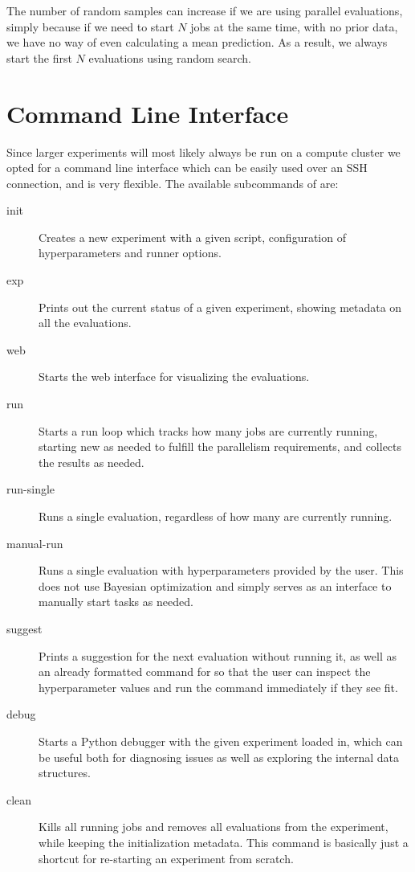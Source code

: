 The number of random samples can increase if we are using parallel evaluations, simply because if we need to start $N$ jobs at the same time, with no prior data, we have no way of even calculating a mean prediction. As a result, we always start the first $N$ evaluations using random search.

\section{Command Line Interface}

Since larger experiments will most likely always be run on a compute cluster we opted for a command line interface which can be easily used over an SSH connection, and is very flexible. The available subcommands of \bopt are:

\begin{description}
    \item[init] Creates a new experiment with a given script, configuration of hyperparameters and runner options.
    \item[exp] Prints out the current status of a given experiment, showing metadata on all the evaluations.
    \item[web] Starts the web interface for visualizing the evaluations.
    \item[run] Starts a run loop which tracks how many jobs are currently running, starting new as needed to fulfill the parallelism requirements, and collects the results as needed.
    \item[run-single] Runs a single evaluation, regardless of how many are currently running.
    \item[manual-run] Runs a single evaluation with hyperparameters provided by the user. This does not use Bayesian optimization and simply serves as an interface to manually start tasks as needed.
    \item[suggest] Prints a suggestion for the next evaluation without running it, as well as an already formatted command for  so that the user can inspect the hyperparameter values and run the command immediately if they see fit.
    \item[debug] Starts a Python debugger with the given experiment loaded in, which can be useful both for diagnosing issues as well as exploring the internal data structures.
    \item[clean] Kills all running jobs and removes all evaluations from the experiment, while keeping the initialization metadata. This command is basically just a shortcut for re-starting an experiment from scratch.
\end{description}

